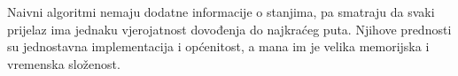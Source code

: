 Naivni algoritmi  nemaju dodatne informacije o stanjima, pa smatraju da svaki prijelaz ima jednaku vjerojatnost dovođenja do najkraćeg puta. 
Njihove prednosti su jednostavna implementacija i općenitost, a mana im je velika memorijska i vremenska složenost. 
